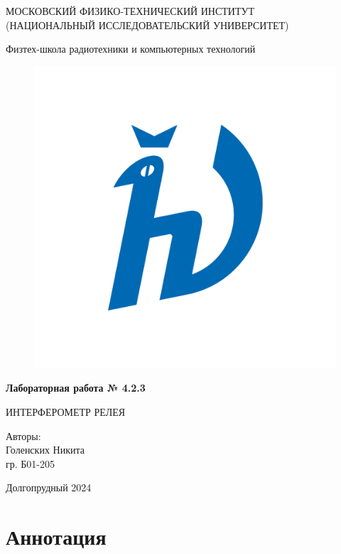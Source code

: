 


\begin{titlepage}
    \begin{center}
    
    \Large МОСКОВСКИЙ ФИЗИКО-ТЕХНИЧЕСКИЙ ИНСТИТУТ \\ (НАЦИОНАЛЬНЫЙ ИССЛЕДОВАТЕЛЬСКИЙ УНИВЕРСИТЕТ)
    \vspace{0.3cm}
    
    \Large Физтех-школа радиотехники и компьютерных технологий
    \vspace{1cm}

  \begin{figure}[h]
    \centering
    \includegraphics[width=0.5\linewidth]{logo.png}
    \label{fig:logo} 
  \end{figure}

    \Huge {\bfseries Лабораторная работа № 4.2.3} 
    
ИНТЕРФЕРОМЕТР РЕЛЕЯ

    \vspace{1cm}
    
    \begin{flushright}
{\LARGE Авторы:\\ Голенских Никита \\ гр. Б01-205}
\end{flushright}
    
    \vspace{\fill}
    \Large Долгопрудный 2024
    
    \end{center}
    \end{titlepage}

    \tableofcontents
    \newpage
    
\section{Аннотация}

